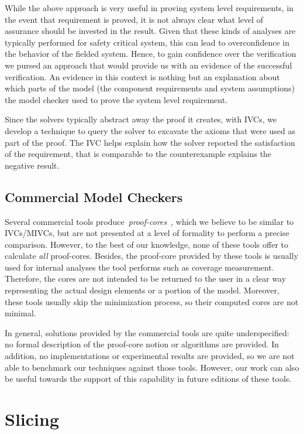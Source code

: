 While the above approach is very useful in proving system level requirements, in the event
that requirement is proved, it is not always clear what level of assurance should be invested in the
result.  Given that these kinds of analyses are typically performed for safety critical system, this
can lead to overconfidence in the behavior of the fielded system.
Hence, to gain confidence over the verification we pursed an approach that would provide
us with an evidence of the successful verification. An evidence in this context is nothing but an
explanation about which parts of the model (the component requirements and system assumptions) the
model checker used to prove the system level requirement.

Since the solvers typically abstract away the proof it creates, with IVCs, we develop a technique to query the solver to excavate the axioms that were used as part of the proof. The IVC helps explain how the solver reported the satisfaction of the requirement, that is comparable to the counterexample explains the negative result.



\subsection{Commercial Model Checkers}
Several commercial tools produce~\emph{proof-cores}~\cite{hanna2015formal, jasper_gold}, which we believe to be similar to IVCs/MIVCs, but are not presented at a level of formality to perform a precise comparison.  However, to the best of our knowledge, none of these tools offer to calculate \emph{all} proof-cores. Besides, the proof-core provided by these tools is usually used for internal analyses the tool performs such as coverage measurement. Therefore, the cores are not intended to be returned to the user in a clear way representing the actual design elements or a portion of the model. Moreover, these tools usually skip the minimization process, so their computed cores are not minimal.

In general, solutions provided by the commercial tools are quite underspecified:
no formal description of the proof-core notion or algorithms are provided. In addition, no implementations or experimental results are provided, so we are not able to benchmark our techniques against those tools. However, our work can also be useful towards the support of this capability in future editions of these tools.

\section{Slicing}

